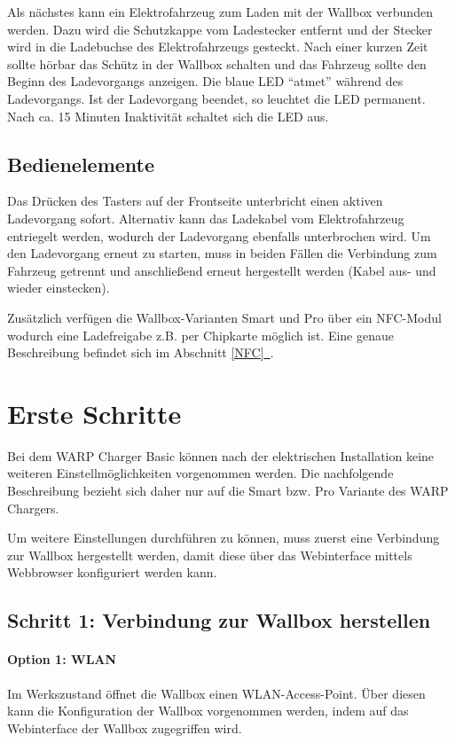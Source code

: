 \documentclass[a4paper,10pt]{article}
\newcommand*{\fullref}[1]{Abschnitt \hyperref[{#1}]{\ref*{#1}~\nameref*{#1}}}
\begin{document}
\begin{multicols*}{2}
    Als nächstes kann ein Elektrofahrzeug zum Laden mit der Wallbox verbunden
    werden. Dazu wird die Schutzkappe vom Ladestecker entfernt und der Stecker
	wird in die Ladebuchse des Elektrofahrzeugs gesteckt. Nach einer kurzen Zeit sollte hörbar
    das Schütz in der Wallbox schalten und das Fahrzeug sollte den Beginn
    des Ladevorgangs anzeigen. Die blaue LED \enquote{atmet} während des
    Ladevorgangs. Ist der Ladevorgang beendet, so leuchtet die LED permanent. Nach ca.
    15 Minuten Inaktivität schaltet sich die LED aus.

    \subsection{Bedienelemente}\label{lockswitch}
    Das Drücken des Tasters auf der Frontseite unterbricht einen aktiven Ladevorgang
    sofort. Alternativ kann das Ladekabel vom Elektrofahrzeug entriegelt werden,
    wodurch der Ladevorgang ebenfalls unterbrochen wird. Um den Ladevorgang erneut
    zu starten, muss in beiden Fällen die Verbindung zum Fahrzeug getrennt und
    anschließend erneut hergestellt werden (Kabel aus- und wieder einstecken).

    Zusätzlich verfügen die Wallbox-Varianten Smart und Pro über ein NFC-Modul
	wodurch eine Ladefreigabe z.B. per Chipkarte möglich ist. Eine
    genaue Beschreibung befindet sich im \fullref{NFC}.

    \newpage
    \section{Erste Schritte}\label{setup}

    Bei dem WARP Charger Basic können nach der elektrischen Installation
    keine weiteren Einstellmöglichkeiten vorgenommen werden. Die nachfolgende
    Beschreibung bezieht sich daher nur auf die Smart bzw. Pro Variante des WARP
    Chargers.

    Um weitere Einstellungen durchführen zu können, muss zuerst eine Verbindung
    zur Wallbox hergestellt werden, damit diese über das Webinterface mittels
	Webbrowser konfiguriert werden kann.

    \subsection{Schritt 1: Verbindung zur Wallbox herstellen}

    \paragraph{Option 1: WLAN}
    Im Werkszustand öffnet die Wallbox einen WLAN-Access-Point. Über diesen kann
    die Konfiguration der Wallbox vorgenommen werden, indem auf das
    Webinterface der Wallbox zugegriffen wird.


\end{multicols*}
\end{document}

